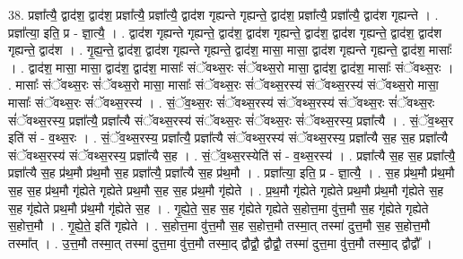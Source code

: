 \documentclass[17pt]{extarticle}
\begin{document}
38. प्रज्ञा᳚त्यै॒ द्वाद॑श॒ द्वाद॑श॒ प्रज्ञा᳚त्यै॒ प्रज्ञा᳚त्यै॒ द्वाद॑श गृह्यन्ते गृह्यन्ते॒ द्वाद॑श॒ प्रज्ञा᳚त्यै॒ प्रज्ञा᳚त्यै॒ द्वाद॑श गृह्यन्ते । . प्रज्ञा᳚त्या॒ इति॒ प्र - ज्ञा॒त्यै॒ । . द्वाद॑श गृह्यन्ते गृह्यन्ते॒ द्वाद॑श॒ द्वाद॑श गृह्यन्ते॒ द्वाद॑श॒ द्वाद॑श गृह्यन्ते॒ द्वाद॑श॒ द्वाद॑श गृह्यन्ते॒ द्वाद॑श । . गृ॒ह्य॒न्ते॒ द्वाद॑श॒ द्वाद॑श गृह्यन्ते गृह्यन्ते॒ द्वाद॑श॒ मासा॒ मासा॒ द्वाद॑श गृह्यन्ते गृह्यन्ते॒ द्वाद॑श॒ मासाः᳚ । . द्वाद॑श॒ मासा॒ मासा॒ द्वाद॑श॒ द्वाद॑श॒ मासाः᳚ संॅवथ्स॒रः सं॑ॅवथ्स॒रो मासा॒ द्वाद॑श॒ द्वाद॑श॒ मासाः᳚ संॅवथ्स॒रः । . मासाः᳚ संॅवथ्स॒रः सं॑ॅवथ्स॒रो मासा॒ मासाः᳚ संॅवथ्स॒रः सं॑ॅवथ्स॒रस्य॑ संॅवथ्स॒रस्य॑ संॅवथ्स॒रो मासा॒ मासाः᳚ संॅवथ्स॒रः सं॑ॅवथ्स॒रस्य॑ । . सं॒ॅव॒थ्स॒रः सं॑ॅवथ्स॒रस्य॑ संॅवथ्स॒रस्य॑ संॅवथ्स॒रः सं॑ॅवथ्स॒रः सं॑ॅवथ्स॒रस्य॒ प्रज्ञा᳚त्यै॒ प्रज्ञा᳚त्यै संॅवथ्स॒रस्य॑ संॅवथ्स॒रः सं॑ॅवथ्स॒रः सं॑ॅवथ्स॒रस्य॒ प्रज्ञा᳚त्यै । . सं॒ॅव॒थ्स॒र इति॑ सं - व॒थ्स॒रः । . सं॒ॅव॒थ्स॒रस्य॒ प्रज्ञा᳚त्यै॒ प्रज्ञा᳚त्यै संॅवथ्स॒रस्य॑ संॅवथ्स॒रस्य॒ प्रज्ञा᳚त्यै स॒ह स॒ह प्रज्ञा᳚त्यै संॅवथ्स॒रस्य॑ संॅवथ्स॒रस्य॒ प्रज्ञा᳚त्यै स॒ह । . सं॒ॅव॒थ्स॒रस्येति॑ सं - व॒थ्स॒रस्य॑ । . प्रज्ञा᳚त्यै स॒ह स॒ह प्रज्ञा᳚त्यै॒ प्रज्ञा᳚त्यै स॒ह प्र॑थ॒मौ प्र॑थ॒मौ स॒ह प्रज्ञा᳚त्यै॒ प्रज्ञा᳚त्यै स॒ह प्र॑थ॒मौ । . प्रज्ञा᳚त्या॒ इति॒ प्र - ज्ञा॒त्यै॒ । . स॒ह प्र॑थ॒मौ प्र॑थ॒मौ स॒ह स॒ह प्र॑थ॒मौ गृ॑ह्येते गृह्येते प्रथ॒मौ स॒ह स॒ह प्र॑थ॒मौ गृ॑ह्येते । . प्र॒थ॒मौ गृ॑ह्येते गृह्येते प्रथ॒मौ प्र॑थ॒मौ गृ॑ह्येते स॒ह स॒ह गृ॑ह्येते प्रथ॒मौ प्र॑थ॒मौ गृ॑ह्येते स॒ह । . गृ॒ह्ये॒ते॒ स॒ह स॒ह गृ॑ह्येते गृह्येते स॒होत्त॒मा वु॑त्त॒मौ स॒ह गृ॑ह्येते गृह्येते स॒होत्त॒मौ । . गृ॒ह्ये॒ते॒ इति॑ गृह्येते । . स॒होत्त॒मा वु॑त्त॒मौ स॒ह स॒होत्त॒मौ तस्मा॒त् तस्मा॑ दुत्त॒मौ स॒ह स॒होत्त॒मौ तस्मा᳚त् । . उ॒त्त॒मौ तस्मा॒त् तस्मा॑ दुत्त॒मा वु॑त्त॒मौ तस्मा॒द् द्वौद्वौ॒ द्वौद्वौ॒ तस्मा॑ दुत्त॒मा वु॑त्त॒मौ तस्मा॒द् द्वौद्वौ᳚ । \newline
\end{document}
